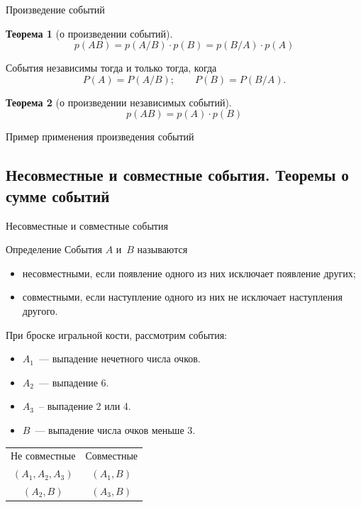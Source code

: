 \documentclass[unicode,11pt,notheorems,xcolor=table]{beamer}
\newtheorem{theorem}{Теорема}
\begin{document}
\begin{frame}{Произведение событий}{}
    
    \begin{theorem}[о произведении событий]
        $$
        p(AB)=p(A/B) \cdot p(B) =  p(B/A) \cdot p(A)
        $$
    \end{theorem}

    \bigskip
    События независимы тогда и только тогда, когда
    $$
        P(A) = P(A/B);\qquad   P(B) = P(B/A).
    $$
    \begin{theorem}[о произведении независимых событий]
        $$
        p(AB)=p(A) \cdot p(B) 
        $$
    \end{theorem}
\end{frame}
\begin{frame}{Пример применения произведения событий}
    
\end{frame}
\subsection{Несовместные и совместные события. Теоремы о сумме событий}

\begin{frame}{Несовместные и совместные события}{}
\begin{block}{Определение}
    События  $A$ и~$B$ называются
    \begin{itemize}
        \item  \alert{несовместными}, если появление одного из них исключает появление других;
        \item \alert{совместными}, если наступление одного из них не исключает наступления другого.
    \end{itemize}
\end{block}

При броске игральной кости, рассмотрим события:
\begin{itemize}
    \item $A_1$~--- выпадение нечетного числа очков.
    \item $A_2$~--- выпадение 6.
    \item $A_3$~--  выпадение  2 или 4.
    \item $B$~---   выпадение числа очков меньше 3.
\end{itemize}
{\centering\color{vgured}\begin{tabular}{cc}
    Не совместные & Совместные \\
    $(A_1, A_2, A_ 3)$ & $(A_1, B)$\\
    $(A_2, B)$         & $(A_3, B)$\\
\end{tabular}\par}
\end{frame}
\end{document}
